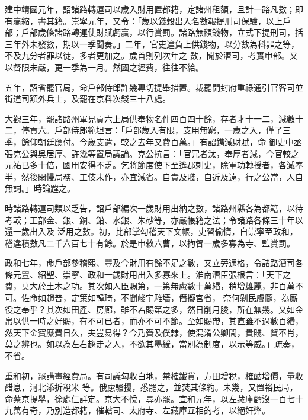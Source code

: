 \begin{pinyinscope}
 建中靖國元年，詔諸路轉運司以歲入財用置都籍，定諸州租額，且計一路凡數；即有贏縮，書其籍。崇寧元年，又令：「歲以錢穀出入名數報提刑司保驗，以上戶部；戶部歲條諸路轉運使財賦虧贏，以行賞罰。諸路無額錢物，立式下提刑司，括三年外未發數，期以一季聞奏。」二年，官吏違負上供錢物，以分數為科罪之等，不及九分者罪以徒，多者更加之。歲首則列次年之
 數，聞於漕司，考實申部。又以督限未嚴，更一季為一月。然國之經費，往往不給。



 五年，詔省罷官局，命戶部侍郎許幾專切提舉措置。裁罷開封府重祿通引官客司並街道司額外兵士，及罷在京料次錢三十八處。



 大觀三年，罷諸路州軍見貢六上局供奉物名件四百四十餘，存者才十一二，減數十二，停貢六。戶部侍郎範坦言：「戶部歲入有限，支用無窮，一歲之入，僅了三季，餘仰朝廷應付。今歲支遣，較之去年又費百萬。」有詔鐫減財賦，命
 御史中丞張克公與吳居厚、許幾等置局議論。克公抗言：「官冗者汰，奉厚者減，今官較之元祐已多十倍，國用安得不乏。乞將節度使下至遙郡刺史，除軍功轉授者，各減奉半，然後閑慢局務、工伎末作，亦宜減省。自貴及賤，自近及遠，行之公當，人自無詞。」時論韙之。



 時諸路轉運司類以乏告，詔戶部編次一歲財用出納之數，諸路州縣各為都籍，以待考較；工部金、銀、銅、鉛、水銀、朱砂等，亦嚴帳籍之法；令諸路各條三十年以還一歲出入及
 泛用之數。初，比部掌勾稽天下文帳，吏習偷惰，自崇寧至政和，稽違積數凡二千六百七十有餘。於是申敕六曹，以拘督一歲多寡為寺、監賞罰。



 政和七年，命戶部參稽熙、豐及今財用有餘不足之數，又立旁通格，令諸路漕司各條元豐、紹聖、崇寧、政和一歲財用出入多寡來上。淮南漕臣張根言：「天下之費，莫大於土木之功。其次如人臣賜第，一第無慮數十萬緡，稍增雄麗，非百萬不可。佐命如趙普，定策如韓琦，不聞峻宇雕墻，僭擬宮省，
 奈何剝民膚髓，為廝役之奉乎？其次如田產、房廊，雖不若賜第之多，然日削月朘，所在無幾。又如金帛以供一時之好賜，有不可已者，而亦不可不節。至如賜帶，其直雖不過數百緡，然天下金寶糜費日久，夫豈易得？今乃賚及僕隸，使混淆公卿間，貴賤、賢不肖，莫之辨也。如以為左右趨走之人，不欲其墨綬，當別為制度，以示等威。」疏奏，不省。



 重和初，罷講畫經費局。有司議勾收白地，禁榷鐵貨，方田增稅，榷酤增價，量收醋息，河北添折稅米
 等。俄慮騷擾，悉罷之，並焚其條約。未幾，又置裕民局，命蔡京提舉，徐處仁詳定。京大不悅，尋亦罷。宣和元年，以左藏庫虧沒一百七十九萬有奇，乃別造都籍，催轄司、太府寺、左藏庫互相鉤考，以絕奸弊。




\end{pinyinscope}
